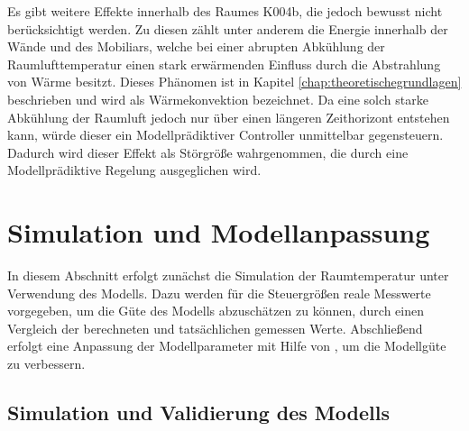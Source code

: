 Es gibt weitere Effekte innerhalb des Raumes K004b, die jedoch bewusst nicht berücksichtigt werden. Zu diesen zählt unter anderem die Energie innerhalb der Wände und des Mobiliars, welche bei einer abrupten Abkühlung der Raumlufttemperatur einen stark erwärmenden Einfluss durch die Abstrahlung von Wärme besitzt. Dieses Phänomen ist in Kapitel \ref{chap:theoretischegrundlagen} beschrieben und wird als Wärmekonvektion bezeichnet. Da eine solch starke Abkühlung der Raumluft jedoch nur über einen längeren Zeithorizont entstehen kann, würde dieser ein Modellprädiktiver Controller unmittelbar gegensteuern. Dadurch wird dieser Effekt als Störgröße wahrgenommen, die durch eine Modellprädiktive Regelung ausgeglichen wird.


\section{Simulation und Modellanpassung}

In diesem Abschnitt erfolgt zunächst die Simulation der Raumtemperatur unter Verwendung des Modells. Dazu werden für die Steuergrößen reale Messwerte vorgegeben, um die Güte des Modells abzuschätzen zu können, durch einen Vergleich der berechneten und tatsächlichen gemessen Werte. Abschließend erfolgt eine Anpassung der Modellparameter mit Hilfe von \cite{casiopeia}, um die Modellgüte zu verbessern.

\subsection{Simulation und Validierung des Modells}

